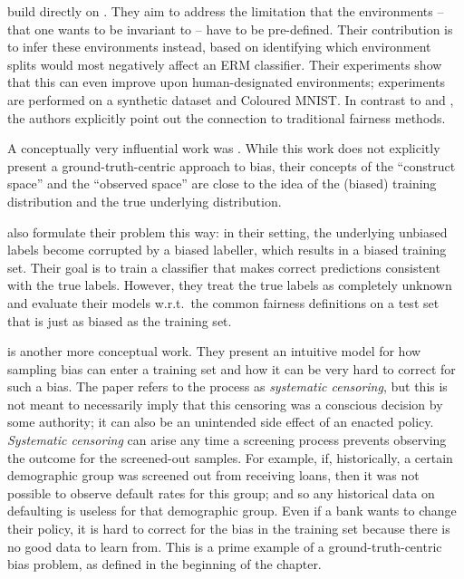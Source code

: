 \citet{creager2020environment} build directly on \citet{arjovsky2019invariant}.
They aim to address the limitation that the environments -- that one wants to be invariant to -- have to be pre-defined.
Their contribution is to infer these environments instead,
based on identifying which environment splits would most negatively affect an \ac{ERM} classifier.
Their experiments show that this can even improve upon human-designated environments;
experiments are performed on a synthetic dataset and Coloured MNIST.
In contrast to \citet{kim2019learning} and \citet{arjovsky2019invariant},
the authors explicitly point out the connection to traditional fairness methods.

A conceptually very influential work was \citet{friedler2016possibility}.
While this work does not explicitly present a ground-truth-centric approach to bias,
their concepts of the ``construct space'' and the ``observed space'' are close
to the idea of the (biased) training distribution and the true underlying distribution.

\citet{jiang2020identifying} also formulate their problem this way:
in their setting, the underlying unbiased labels become corrupted by a biased labeller,
which results in a biased training set.
Their goal is to train a classifier that makes correct predictions consistent with the true labels.
However, they treat the true labels as completely unknown
and evaluate their models w.r.t.\ the common fairness definitions on a test set
that is just as biased as the training set.

\citet{kallus2018residual} is another more conceptual work.
They present an intuitive model for how sampling bias can enter a training set
and how it can be very hard to correct for such a bias.
The paper refers to the process as \emph{systematic censoring},
but this is not meant to necessarily imply that this censoring was a conscious decision by some authority;
it can also be an unintended side effect of an enacted policy.
\emph{Systematic censoring} can arise any time a screening process prevents observing the outcome for the screened-out samples.
For example, if, historically, a certain demographic group was screened out from receiving loans,
then it was not possible to observe default rates for this group;
and so any historical data on defaulting is useless for that demographic group.
Even if a bank wants to change their policy,
it is hard to correct for the bias in the training set because there is no good data to learn from.
This is a prime example of a ground-truth-centric bias problem,
as defined in the beginning of the chapter.

